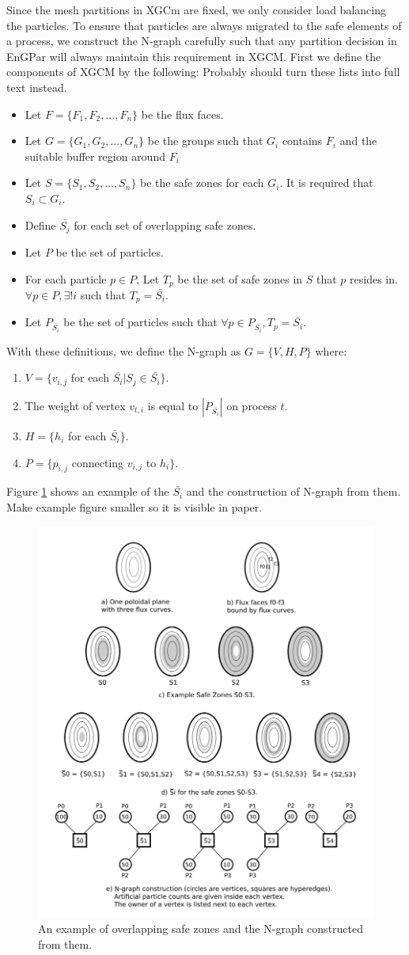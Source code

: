 \documentclass[conference]{IEEEtran}
\begin{document}
Since the mesh partitions in XGCm are fixed, we only consider
load balancing the particles. To ensure that particles are always migrated to the safe elements
of a process, we construct the N-graph carefully such that any partition
decision in EnGPar will always maintain this requirement in XGCM. First we define
the components of XGCM by the following:
{\color{red} Probably should turn these lists into full text instead.}
\begin{itemize}
\item Let $F = \{F_1,F_2, ..., F_n\}$ be the flux faces.
\item Let $G = \{G_1, G_2, ..., G_n\}$ be the groups such that $G_i$
  contains $F_i$ and the suitable buffer region around $F_i$
\item Let $S = \{S_1,S_2,...,S_n\}$ be the safe zones for each $G_i$.
  It is required that $S_i \subset G_i$.
\item Define $\bar{S_j}$ for each set of overlapping safe zones.
\item Let $P$ be the set of particles.
\item For each particle $p\in P$, Let $T_p$ be the set of safe zones in $S$ that $p$ resides
  in.  $\forall p \in P, \exists ! i$ such that $T_p = \bar{S_i}$.
\item  Let $P_{\bar{S_i}}$ be the set of particles such that $\forall p \in P_{\bar{S_i}}, T_p = \bar{S_i}$.
\end{itemize}

With these definitions, we define the N-graph as $G = \{V, H, P\}$ where:
\begin{enumerate}
\item $V = \{ v_{i,j}$ for each $\bar{S_i} | S_j \in \bar{S_i} \}$.
\item The weight of vertex $v_{t,i}$ is equal to $|P_{\bar{S_i}}|$ on process $t$.
\item $H = \{ h_i$ for each $\bar{S_i} \}$.
\item $P = \{ p_{i,j}$ connecting $v_{i,j}$ to $h_i \}$.
\end{enumerate}
Figure \ref{fig:sbars} shows an example of the $\bar{S_i}$ and the construction of N-graph from
them. {\color{red} Make example figure smaller so it is visible in paper.}

\begin{figure}[!ht]
  \centering
  \includegraphics[width=.4\textwidth]{../figures/xgcm_ngraph_construction.png}
  \caption{An example of overlapping safe zones and the N-graph constructed from them.}
  \label{fig:sbars}
\end{figure}
\end{document}
